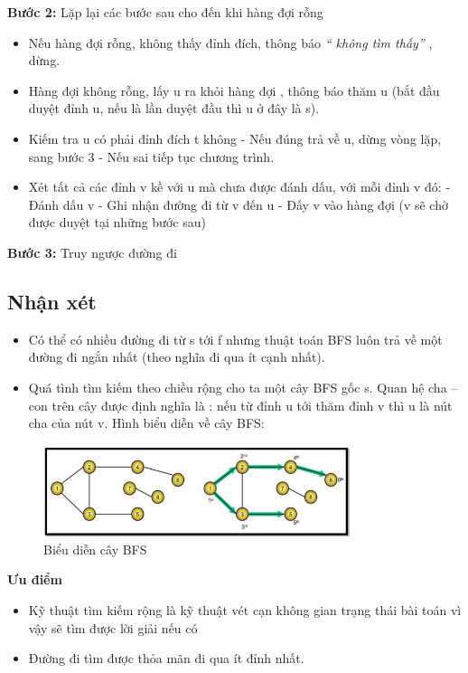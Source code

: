 \textbf{Bước 2:} Lặp lại các bước sau cho đến khi hàng đợi rỗng
\begin{itemize}
	\item Nếu hàng đợi rỗng, không thấy đỉnh đích, thông báo \textit{“ không tìm thấy”} ,
	dừng.
	\item Hàng đợi không rỗng, lấy u ra khỏi hàng đợi , thông báo thăm u (bắt đầu
	duyệt đỉnh u, nếu là lần duyệt đầu thì u ở đây là s).
	\item Kiếm tra u có phải đỉnh đích t không
		\subitem - Nếu đúng trả về u, dừng vòng lặp, sang bước 3
		\subitem - Nếu sai tiếp tục chương trình.
	\item Xét tất cả các đỉnh v kề với u mà chưa được đánh dấu, với mỗi đỉnh v đó:
		\subitem - Đánh dấu v
		\subitem - Ghi nhận đường đi từ v đến u
		\subitem - Đấy v vào hàng đợi (v sẽ chờ được duyệt tại những bước sau)
\end{itemize}

\textbf{Bước 3:} Truy ngược đường đi

\subsection{Nhận xét}
\begin{itemize}
	\item Có thể có nhiều đường đi từ s tới f nhưng thuật toán BFS luôn trả về một
	đường đi ngắn nhất (theo nghĩa đi qua ít cạnh nhất).
	\item Quá tình tìm kiếm theo chiều rộng cho ta một cây BFS gốc s. Quan hệ cha –
	con trên cây được định nghĩa là : nếu từ đỉnh u tới thăm đỉnh v thì u là nút
	cha của nút v. Hình biểu diễn về cây BFS:
\end{itemize}

\begin{figure}[h!]
	\centering
	\includegraphics[width=0.8\textwidth]{
		Figures/figs/bieuDienCayBFS.jpg
	}
	\caption[Biểu diễn cây BFS]{
		Biểu diễn cây BFS
	}
	\label{fig:hinhd}
\end{figure}

\textbf{Ưu điểm}
\begin{itemize}
	\item Kỹ thuật tìm kiếm rộng là kỹ thuật vét cạn không gian trạng thái bài toán vì
	vậy sẽ tìm được lời giải nếu có
	\item Đường đi tìm được thỏa mãn đi qua ít đỉnh nhất.
\end{itemize}

